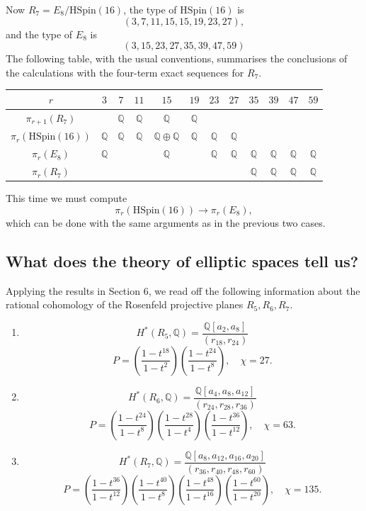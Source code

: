 \documentclass[twoside,a4paper,reqno,11pt]{amsart}
\newcommand{\Q}{\mathbb{Q}}
\newcommand{\HSpin}{\mathrm{HSpin}}
\begin{document}
Now $R_7 = E_8/\HSpin(16)$, the type of $\HSpin(16)$ is
 $$
(3, 7, 11, 15, 15, 19, 23, 27),
$$
and the type of $E_8$ is
$$
(3, 15, 23, 27, 35, 39, 47, 59)
$$
The following table, with the usual conventions,  summarises the conclusions of the calculations with the four-term exact sequences for $R_7$. 
\vspace{\baselineskip}
\begin{center}
\begin{tabular}{ |c | c | c | c | c | c | c | c | c | c | c | c | }
\hline
$r$ & $3$ & $7$ & $11$ & $15$ & $19$ & $23$ & $27$ & $35$ & $39$ & $47$ & $59$ \\
\hline
$\pi_{r+1}(R_7)$ &  & $\Q$ & $\Q$ & $\Q$ &$\Q$  &  &  &  &  &  & \\
\hline
$\pi_{r}(\HSpin(16))$ &$\Q$ & $\Q$ & $\Q$ & $\Q\oplus \Q$ & $\Q$ & $\Q$ & $\Q$ & & & & \\
\hline
$\pi_{r}(E_8)$ & $\Q$ & & & $\Q$ & & $\Q$ & $\Q$ & $\Q$ & $\Q$ & $\Q$ & $\Q$ \\
\hline
$\pi_{r}(R_7)$ &  &  &  &  &  &  & & $\Q$ & $\Q$ & $\Q$ & $\Q$ \\
\hline
\end{tabular}
\end{center}
\vspace{\baselineskip}
This time we must compute 
$$
\pi_r(\HSpin(16)) \to \pi_r(E_8),
$$ 
which can be done with the same arguments as in the previous two cases.  

\subsection{What does the theory of elliptic spaces tell us?}
Applying the results in Section 6, we read off the following information about the rational cohomology of the Rosenfeld projective planes $R_5, R_6, R_7$.
\begin{enumerate}
\item\[ 
H^*(R_5, \Q) = \frac{\Q[a_2, a_8]}{(r_{18},r_{24})} \]
\[
P = \left(\frac{1-t^{18}}{1-t^2}\right)\left(\frac{1-t^{24}}{1-t^8}\right), \quad \chi = 27.
\]
\item
\[ H^*(R_6, \Q) = \frac{\Q[a_4, a_8, a_{12}]}{(r_{24}, r_{28}, r_{36})}\]
\[ P = \left(\frac{1-t^{24}}{1-t^{8}} \right)\left(\frac{1-t^{28}}{1-t^4}\right)\left(\frac{1-t^{36}}{1-t^{12}}\right), \quad \chi = 63. \]
\item \[ H^*(R_7, \Q) = \frac{\Q[a_8, a_{12}, a_{16}, a_{20}]}{(r_{36}, r_{40}, r_{48}, r_{60})} \] 
\[ P = \left(\frac{1-t^{36}}{1-t^{12}}\right)\left(\frac{1-t^{40}}{1-t^{8}}\right)\left(\frac{1-t^{48}}{1-t^{16}}\right)\left(\frac{1-t^{60}}{1-t^{20}}\right), \quad \chi = 135.\] 
\end{enumerate}
\end{document}
